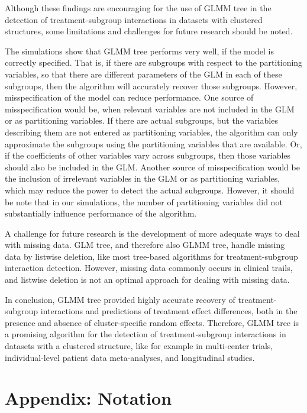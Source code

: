 \documentclass[nobf,doc]{apa}
\begin{document}
Although these findings are encouraging for the use of GLMM tree in the detection of treatment-subgroup interactions in datasets with clustered structures, some limitations and challenges for future research should be noted.

The simulations show that GLMM tree performs very well, if the model is correctly specified. That is, if there are subgroups with respect to the partitioning variables, so that there are different parameters of the GLM in each of these subgroups, then the algorithm will accurately recover those subgroups. However, misspecification of the model can reduce performance. One source of misspecification would be, when relevant variables are not included in the GLM or as partitioning variables. If there are actual subgroups, but the variables describing them are not entered as partitioning variables, the algorithm can only approximate the subgroups using the partitioning variables that are available. Or, if the coefficients of other variables vary across subgroups, then those variables should also be included in the GLM. Another source of misspecification would be the inclusion of irrelevant variables in the GLM or as partitioning variables, which may reduce the power to detect the actual subgroups. However, it should be note that in our simulations, the number of partitioning variables did not substantially influence performance of the algorithm. 
  
A challenge for future research is the development of more adequate ways to deal with missing data. GLM tree, and therefore also GLMM tree, handle missing data by listwise deletion, like most tree-based algorithms for treatment-subgroup interaction detection. However, missing data commonly occurs in clinical trails, and listwise deletion is not an optimal approach for dealing with missing data.

In conclusion, GLMM tree provided highly accurate recovery of treatment-subgroup interactions and predictions of treatment effect differences, both in the presence and absence of cluster-specific random effects. Therefore, GLMM tree is a promising algorithm for the detection of treatment-subgroup interactions in datasets with a clustered structure, like for example in multi-center trials, individual-level patient data meta-analyses, and longitudinal studies.

\nolinenumbers



\newpage
\section{Appendix: Notation}
\end{document}
